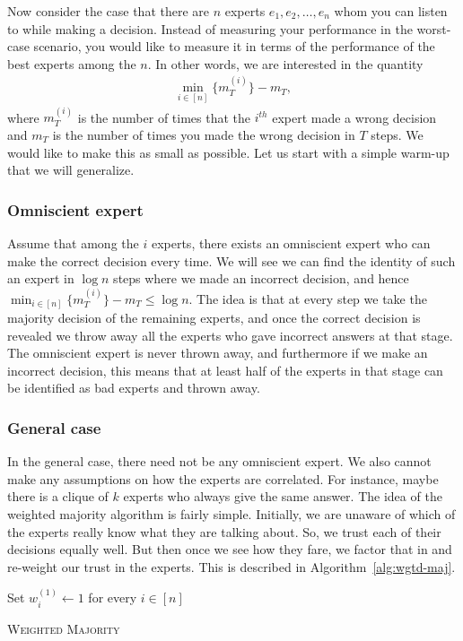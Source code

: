 Now consider the case that there are $n$ experts $e_1, e_2, \ldots, e_n$ whom you can listen to while making a decision. Instead of measuring your performance in the worst-case scenario, you would like to measure it in terms of the performance of the best experts among the $n$. In other words, we are interested in the quantity
\begin{align*}
	\min_{i\in [n]} \{ m^{(i)}_T \} - m_T,
\end{align*}
where $m^{(i)}_T$ is the number of times that the $i^{th}$ expert made a wrong decision and $m_T$ is the number of times you made the wrong decision in $T$ steps. We would like to make this as small as possible. Let us start with a simple warm-up that we will generalize.

\subsubsection*{Omniscient expert}

Assume that among the $i$ experts, there exists an omniscient expert who can make the correct decision every time. We will see we can find the identity of such an expert in $\log n$ steps where we made an incorrect decision, and hence $\min_{i\in [n]} \{ m^{(i)}_T \} - m_T \leq \log n$. The idea is that at every step we take the majority decision of the remaining experts, and once the correct decision is revealed we throw away all the experts who gave incorrect answers at that stage. The omniscient expert is never thrown away, and furthermore if we make an incorrect decision, this means that at least half of the experts in that stage can be identified as bad experts and thrown away.

\subsubsection*{General case}

In the general case, there need not be any omniscient expert. We also cannot make any assumptions on how the experts are correlated. For instance, maybe there is a clique of $k$ experts who always give the same answer. The idea of the weighted majority algorithm is fairly simple. Initially, we are unaware of which of the experts really know what they are talking about. So, we trust each of their decisions equally well. But then once we see how they fare, we factor that in and re-weight our trust in the experts. This is described in Algorithm~\ref{alg:wgtd-maj}.

\begin{algorithm}%
	Set $w_i^{(1)} \gets 1$ for every $i \in [n]$
	
	\caption{\textsc{Weighted Majority}}
	\label{alg:wgtd-maj}
\end{algorithm}

